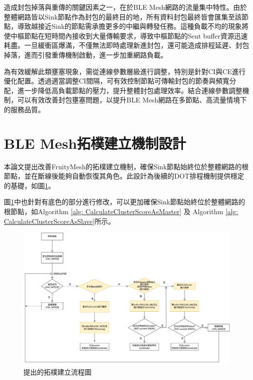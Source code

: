 \begin{ZhChapter}
造成封包掉落與重傳的關鍵因素之一，在於BLE Mesh網路的流量集中特性。由於整體網路皆以Sink節點作為封包的最終目的地，所有資料封包最終皆會匯集至該節點，導致越接近Sink的節點需承擔更多的中繼與轉發任務。這種負載不均的現象將使中樞節點在短時間內接收到大量傳輸要求，導致中樞節點的Sent buffer資源迅速耗盡。一旦緩衝區爆滿，不僅無法即時處理新進封包，還可能造成排程延遲、封包掉落，進而引發重傳機制啟動，進一步加重網路負載。

為有效緩解此類壅塞現象，需從連線參數層級進行調整，特別是針對CI與CE進行優化配置。透過適當調整CI間隔，可有效控制節點可傳輸封包的節奏與頻寬分配，進一步降低高負載節點的壓力，提升整體封包處理效率。結合連線參數調整機制，可以有效改善封包壅塞問題，以提升BLE Mesh網路在多節點、高流量情境下的服務品質。

\clearpage

\section{BLE Mesh拓樸建立機制設計}

本論文提出改善FruityMesh的拓樸建立機制，確保Sink節點始終位於整體網路的根節點，並在斷線後能夠自動恢復其角色。此設計為後續的DOT排程機制提供穩定的基礎，如圖\ref{fig: 提出的拓樸建立流程圖}。

圖\ref{fig: 提出的拓樸建立流程圖}中也針對有底色的部分進行修改，可以更加確保Sink節點始終位於整體網路的根節點，如Algorithm \ref{alg: CalculateClusterScoreAsMaster} 及 Algorithm \ref{alg: CalculateClusterScoreAsSlave}所示。

\begin{figure}[H]
    \centering
    \includegraphics[width = 1\textwidth]{image/build-up_pro2.png}
    \caption{提出的拓樸建立流程圖}
    \label{fig: 提出的拓樸建立流程圖}
\end{figure}


\end{ZhChapter}
